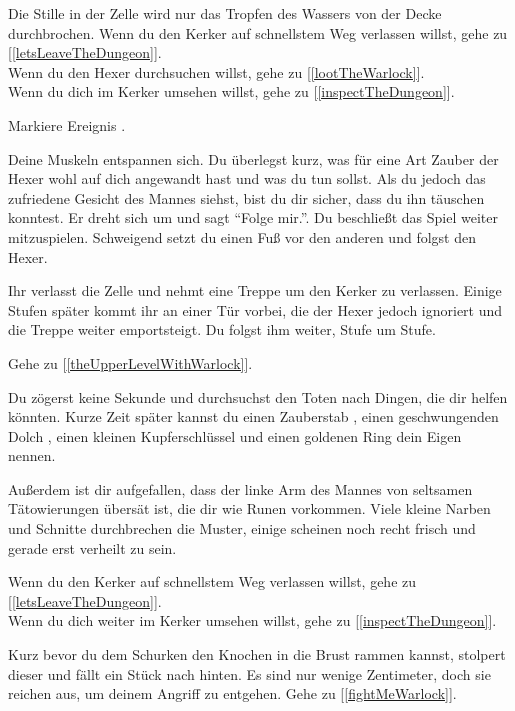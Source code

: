 Die Stille in der Zelle wird nur das Tropfen des Wassers von der Decke durchbrochen. Wenn du den Kerker auf schnellstem Weg verlassen willst, gehe zu [\ref{letsLeaveTheDungeon}].
\\Wenn du den Hexer durchsuchen willst, gehe zu [\ref{lootTheWarlock}].
\\Wenn du dich im Kerker umsehen willst, gehe zu [\ref{inspectTheDungeon}].


Markiere Ereignis .

Deine Muskeln entspannen sich. Du überlegst kurz, was für eine Art Zauber der Hexer wohl auf dich angewandt hast und was du tun sollst. Als du jedoch das zufriedene Gesicht des Mannes siehst, bist du dir sicher, dass du ihn täuschen konntest. Er dreht sich um und sagt ``Folge mir.''. Du beschließt das Spiel weiter mitzuspielen. Schweigend setzt du einen Fuß vor den anderen und folgst den Hexer.

Ihr verlasst die Zelle und nehmt eine Treppe um den Kerker zu verlassen. Einige Stufen später kommt ihr an einer Tür vorbei, die der Hexer jedoch ignoriert und die Treppe weiter emportsteigt. Du folgst ihm weiter, Stufe um Stufe.

Gehe zu [\ref{theUpperLevelWithWarlock}].


Du zögerst keine Sekunde und durchsuchst den Toten nach Dingen, die dir helfen könnten.
Kurze Zeit später kannst du einen Zauberstab , einen geschwungenden Dolch , einen kleinen Kupferschlüssel  und einen goldenen Ring  dein Eigen nennen.

Außerdem ist dir aufgefallen, dass der linke Arm des Mannes von seltsamen Tätowierungen übersät ist, die dir wie Runen vorkommen. Viele kleine Narben und Schnitte durchbrechen die Muster, einige scheinen noch recht frisch und gerade erst verheilt zu sein.

Wenn du den Kerker auf schnellstem Weg verlassen willst, gehe zu [\ref{letsLeaveTheDungeon}].
\\Wenn du dich weiter im Kerker umsehen willst, gehe zu [\ref{inspectTheDungeon}].


Kurz bevor du dem Schurken den Knochen in die Brust rammen kannst, stolpert dieser und fällt ein Stück nach hinten. Es sind nur wenige Zentimeter, doch sie reichen aus, um deinem Angriff zu entgehen. Gehe zu [\ref{fightMeWarlock}].

